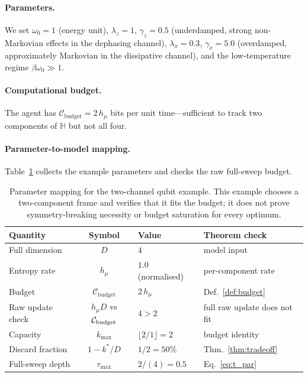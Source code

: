 \documentclass[12pt]{article}
\begin{document}
\paragraph{Parameters.}
We set $\omega_0 = 1$ (energy unit),
$\lambda_z = 1$, $\gamma_z = 0.5$ (underdamped, strong
non-Markovian effects in the dephasing channel),
$\lambda_x = 0.3$, $\gamma_x = 5.0$ (overdamped,
approximately Markovian in the dissipative channel),
and the low-temperature regime $\beta\omega_0 \gg 1$.

\paragraph{Computational budget.}
The agent has
$\mathcal{C}_{\mathrm{budget}} = 2\,h_\mu$
bits per unit time---sufficient to track two components
of $\mathbb{H}$ but not all four.

\paragraph{Parameter-to-model mapping.}
Table~\ref{tab:params} collects the example parameters and
checks the raw full-sweep budget.

\begin{table}[t]
\centering
\small
\begin{tabular}{@{}lcll@{}}
\toprule
\textbf{Quantity} & \textbf{Symbol} & \textbf{Value}
  & \textbf{Theorem check} \\
\midrule
Full dimension & $D$ & $4$ &
  model input \\
Entropy rate & $h_\mu$ & $1.0$ (normalised) &
  per-component rate \\
Budget & $\mathcal{C}_{\mathrm{budget}}$ & $2\,h_\mu$
  & Def.~\ref{def:budget} \\
\midrule
Raw update check & $h_\mu D$ vs $\mathcal{C}_{\rm budget}$
  & $4 > 2$ & full raw update does not fit \\
Capacity & $k_{\max}$ & $\lfloor 2/1 \rfloor = 2$
  & budget identity \\
Discard fraction & $1 - k^*/D$ & $1/2 = 50\%$
  & Thm.~\ref{thm:tradeoff} \\
Full-sweep depth & $\tau_{\max}$ & $2/(4) = 0.5$
  & Eq.~\eqref{eq:t_par} \\
\bottomrule
\end{tabular}
\caption{Parameter mapping for the two-channel qubit
example.  This example chooses a two-component frame and verifies that
it fits the budget; it does not prove symmetry-breaking necessity or
budget saturation for every optimum.}
\label{tab:params}
\end{table}
\end{document}
